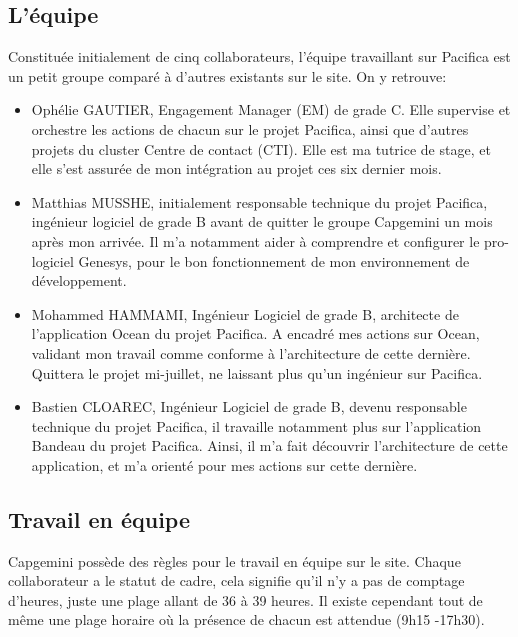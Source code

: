 \documentclass{rapport}
\begin{document}
\subsection{L'équipe}

Constituée initialement de cinq collaborateurs, l'équipe travaillant sur Pacifica est un petit groupe comparé à d'autres existants sur le site.
On y retrouve:\\

\begin{itemize}
  \item Ophélie GAUTIER, Engagement Manager (EM) de grade C. Elle supervise et orchestre les actions de chacun sur le projet Pacifica, ainsi que d'autres projets du cluster Centre de contact (CTI). Elle est ma tutrice de stage, et elle s'est assurée de mon intégration au projet ces six dernier mois.\\
  
  \item Matthias MUSSHE, initialement responsable technique du projet Pacifica, ingénieur logiciel de grade B avant de quitter le groupe Capgemini un mois après mon arrivée. Il m'a notamment aider à comprendre et configurer le pro-logiciel Genesys, pour le bon fonctionnement de mon environnement de développement.\\
  
  \item Mohammed HAMMAMI, Ingénieur Logiciel de grade B, architecte de l'application Ocean du projet Pacifica. A encadré mes actions sur Ocean, validant mon travail comme conforme à l'architecture de cette dernière. Quittera le projet mi-juillet, ne laissant plus qu'un ingénieur sur Pacifica.\\
  
  \item Bastien CLOAREC, Ingénieur Logiciel de grade B, devenu responsable technique du projet Pacifica, il travaille notamment plus sur l'application Bandeau du projet Pacifica. Ainsi, il m'a fait découvrir l'architecture de cette application, et m'a orienté pour mes actions sur cette dernière.\\
  
\end{itemize}

\subsection{Travail en équipe}
Capgemini possède des règles pour le travail en équipe sur le site. Chaque collaborateur a le statut de cadre, cela signifie qu'il n'y a pas de comptage d'heures, juste une plage allant de 36 à 39 heures. Il existe cependant tout de même une plage horaire où la présence de chacun est attendue (9h15 -17h30).\\
\end{document}
